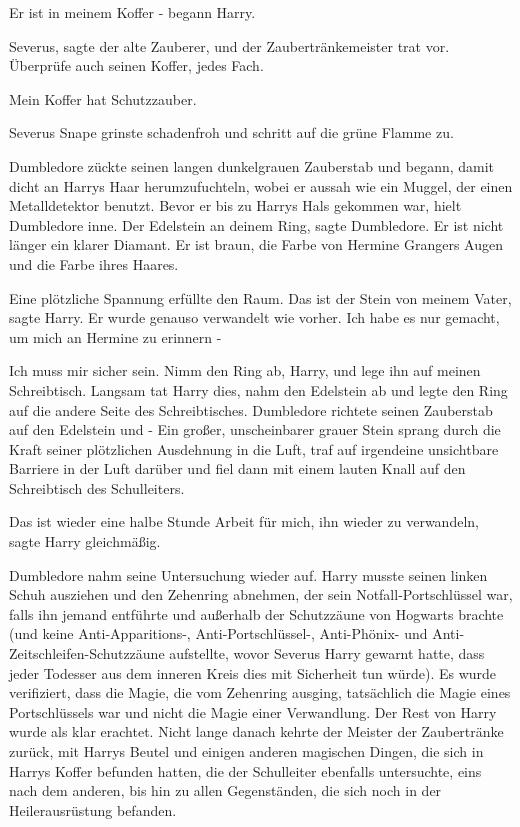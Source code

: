 \glqq{}Er ist in meinem Koffer -\grqq{} begann Harry.

\glqq{}Severus\grqq{}, sagte der alte Zauberer, und der Zaubertränkemeister trat
vor. \glqq{}Überprüfe auch seinen Koffer, jedes Fach.\grqq{}

\glqq{}Mein Koffer hat Schutzzauber.\grqq{}

Severus Snape grinste schadenfroh und schritt auf die grüne Flamme zu.

Dumbledore zückte seinen langen dunkelgrauen Zauberstab und begann, damit dicht
an Harrys Haar herumzufuchteln, wobei er aussah wie ein Muggel, der einen
Metalldetektor benutzt. Bevor er bis zu Harrys Hals gekommen war, hielt
Dumbledore inne. \glqq{}Der Edelstein an deinem Ring\grqq{}, sagte Dumbledore.
\glqq{}Er ist nicht länger ein klarer Diamant. Er ist braun, die Farbe von
Hermine Grangers Augen und die Farbe ihres Haares.\grqq{}

Eine plötzliche Spannung erfüllte den Raum. \glqq{}Das ist der Stein von meinem
Vater\grqq{}, sagte Harry. \glqq{}Er wurde genauso verwandelt wie vorher. Ich
habe es nur gemacht, um mich an Hermine zu erinnern -\grqq{}

\glqq{}Ich muss mir sicher sein. Nimm den Ring ab, Harry, und lege ihn auf meinen
Schreibtisch.\grqq{} Langsam tat Harry dies, nahm den Edelstein ab und legte den
Ring auf die andere Seite des Schreibtisches. Dumbledore richtete seinen
Zauberstab auf den Edelstein und - Ein großer, unscheinbarer grauer Stein sprang
durch die Kraft seiner plötzlichen Ausdehnung in die Luft, traf auf irgendeine
unsichtbare Barriere in der Luft darüber und fiel dann mit einem lauten Knall
auf den Schreibtisch des Schulleiters.

\glqq{}Das ist wieder eine halbe Stunde Arbeit für mich, ihn wieder zu
verwandeln\grqq{}, sagte Harry gleichmäßig.

Dumbledore nahm seine Untersuchung wieder auf. Harry musste seinen linken Schuh
ausziehen und den Zehenring abnehmen, der sein Notfall-Portschlüssel war, falls
ihn jemand entführte und außerhalb der Schutzzäune von Hogwarts brachte (und
keine Anti-Apparitions-, Anti-Portschlüssel-, Anti-Phönix- und
Anti-Zeitschleifen-Schutzzäune aufstellte, wovor Severus Harry gewarnt hatte,
dass jeder Todesser aus dem inneren Kreis dies mit Sicherheit tun würde). Es
wurde verifiziert, dass die Magie, die vom Zehenring ausging, tatsächlich die
Magie eines Portschlüssels war und nicht die Magie einer Verwandlung. Der Rest
von Harry wurde als klar erachtet. Nicht lange danach kehrte der Meister der
Zaubertränke zurück, mit Harrys Beutel und einigen anderen magischen Dingen, die
sich in Harrys Koffer befunden hatten, die der Schulleiter ebenfalls
untersuchte, eins nach dem anderen, bis hin zu allen Gegenständen, die sich noch
in der Heilerausrüstung befanden.

